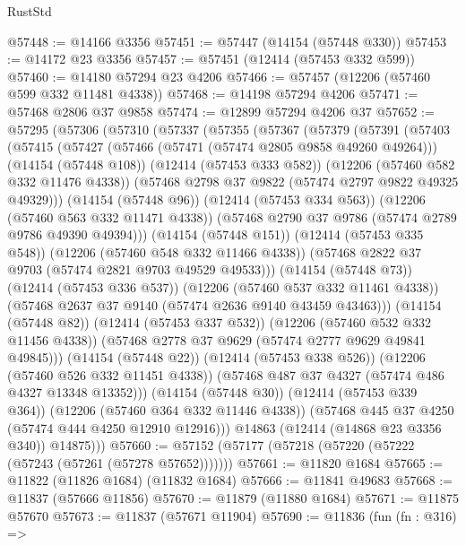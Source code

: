 \begin{lexlean}{RustStd}
\begin{coremodule}
@57448 := @14166 @3356
@57451 := @57447 (@14154 (@57448 @330))
@57453 := @14172 @23 @3356
@57457 := @57451 (@12414 (@57453 @332 @599))
@57460 := @14180 @57294 @23 @4206
@57466 := @57457 (@12206 (@57460 @599 @332 @11481 @4338))
@57468 := @14198 @57294 @4206
@57471 := @57468 @2806 @37 @9858
@57474 := @12899 @57294 @4206 @37
@57652 := @57295
    (@57306
      (@57310
        (@57337
          (@57355
            (@57367
              (@57379
                (@57391
                  (@57403
                    (@57415
                      (@57427
                        (@57466 (@57471 (@57474 @2805 @9858 @49260 @49264)))
                        (@14154 (@57448 @108))
                        (@12414 (@57453 @333 @582))
                        (@12206 (@57460 @582 @332 @11476 @4338))
                        (@57468 @2798 @37 @9822 (@57474 @2797 @9822 @49325 @49329)))
                      (@14154 (@57448 @96))
                      (@12414 (@57453 @334 @563))
                      (@12206 (@57460 @563 @332 @11471 @4338))
                      (@57468 @2790 @37 @9786 (@57474 @2789 @9786 @49390 @49394)))
                    (@14154 (@57448 @151))
                    (@12414 (@57453 @335 @548))
                    (@12206 (@57460 @548 @332 @11466 @4338))
                    (@57468 @2822 @37 @9703 (@57474 @2821 @9703 @49529 @49533)))
                  (@14154 (@57448 @73))
                  (@12414 (@57453 @336 @537))
                  (@12206 (@57460 @537 @332 @11461 @4338))
                  (@57468 @2637 @37 @9140 (@57474 @2636 @9140 @43459 @43463)))
                (@14154 (@57448 @82))
                (@12414 (@57453 @337 @532))
                (@12206 (@57460 @532 @332 @11456 @4338))
                (@57468 @2778 @37 @9629 (@57474 @2777 @9629 @49841 @49845)))
              (@14154 (@57448 @22))
              (@12414 (@57453 @338 @526))
              (@12206 (@57460 @526 @332 @11451 @4338))
              (@57468 @487 @37 @4327 (@57474 @486 @4327 @13348 @13352)))
            (@14154 (@57448 @30))
            (@12414 (@57453 @339 @364))
            (@12206 (@57460 @364 @332 @11446 @4338))
            (@57468 @445 @37 @4250 (@57474 @444 @4250 @12910 @12916)))
          @14863
          (@12414 (@14868 @23 @3356 @340))
          @14875)))
@57660 := @57152 (@57177 (@57218 (@57220 (@57222 (@57243 (@57261 (@57278 @57652)))))))
@57661 := @11820 @1684
@57665 := @11822 (@11826 @1684) (@11832 @1684)
@57666 := @11841 @49683
@57668 := @11837 (@57666 @11856)
@57670 := @11879 (@11880 @1684)
@57671 := @11875 @57670
@57673 := @11837 (@57671 @11904)
@57690 := @11836
    (fun (fn : @316) =>

\end{coremodule}
\end{lexlean}
